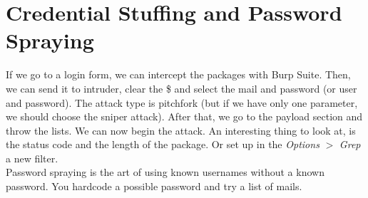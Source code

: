 \documentclass[11pt,a4paper]{article}
\begin{document}
\section{Credential Stuffing and Password Spraying}
If we go to a login form, we can intercept the packages with Burp Suite. Then, we can send it to intruder, clear the \$ and select the mail and password (or user and password). The attack type is pitchfork (but if we have only one parameter, we should choose the sniper attack). After that, we go to the payload section and throw the lists. We can now begin the attack. An interesting thing to look at, is the status code and the length of the package. Or set up in the \textit{Options} $>$ \textit{Grep} a new filter.\\

\noindent Password spraying is the art of using known usernames without a known password. You hardcode a possible password and try a list of mails.
\end{document}
